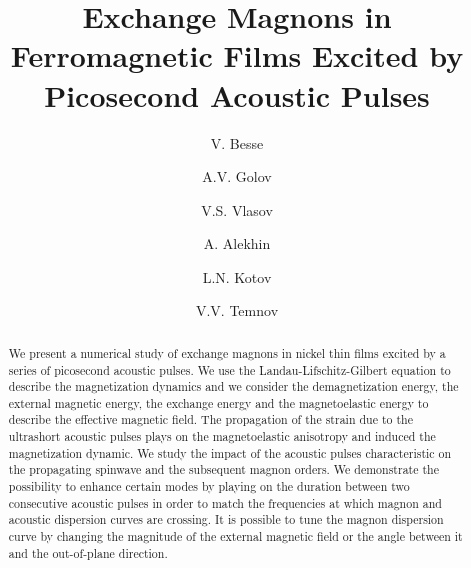\documentclass[%
superscriptaddress,
preprint,
showpacs,
amsmath,
amssymb,
aps,
prl,
]{revtex4-1}
\begin{document}
	
\title{Exchange Magnons in Ferromagnetic Films Excited by Picosecond Acoustic Pulses}
	
\author{V. Besse}
\author{A.V. Golov}
\author{V.S. Vlasov}
\author{A. Alekhin}
\author{L.N. Kotov}
\author{V.V. Temnov}
	
\begin{abstract}
We present a numerical study of exchange magnons in nickel thin films excited by a series of picosecond acoustic pulses.
We use the Landau-Lifschitz-Gilbert equation to describe the magnetization dynamics and we consider the demagnetization energy, the external magnetic energy, the exchange energy and the magnetoelastic energy to describe the effective magnetic field.
The propagation of the strain due to the ultrashort acoustic pulses plays on the magnetoelastic anisotropy and induced the magnetization dynamic.
We study the impact of the acoustic pulses characteristic on the propagating spinwave and the subsequent magnon orders.
We demonstrate the possibility to enhance certain modes by playing on the duration between two consecutive acoustic pulses in order to match the frequencies at which magnon and acoustic dispersion curves are crossing.
It is possible to tune the magnon dispersion curve by changing the magnitude of the external magnetic field or the angle between it and the out-of-plane direction.
\end{abstract}
	
\maketitle
	
\end{document}

